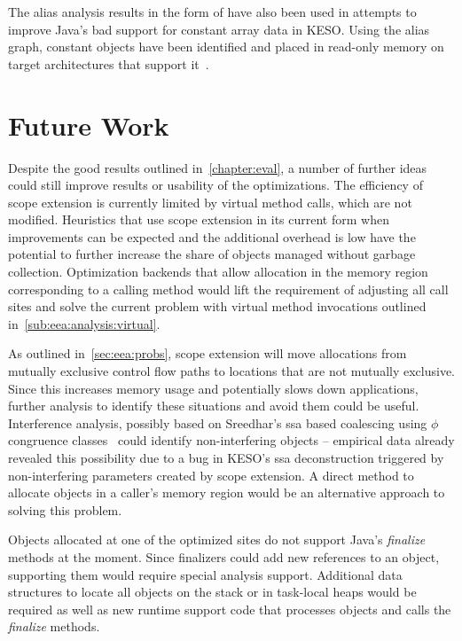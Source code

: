 	The alias analysis results in the form of  have also been used in attempts to improve Java's bad support
	for constant array data in KESO\@. Using the alias graph, constant objects have been identified and placed in read-only
	memory on target architectures that support it~\cite{kuhnle:14}.

	\section*{Future Work}
		\label{sec:conclusion:future-work}
		Despite the good results outlined in~\cref{chapter:eval}, a number of further ideas could still improve results or
		usability of the optimizations. The efficiency of scope extension is currently limited by virtual method calls,
		which are not modified. Heuristics that use scope extension in its current form when improvements can be expected
		and the additional overhead is low have the potential to further increase the share of objects managed without
		garbage collection. Optimization backends that allow allocation in the memory region corresponding to a calling
		method would lift the requirement of adjusting all call sites and solve the current problem with virtual method
		invocations outlined in~\cref{sub:eea:analysis:virtual}.

		As outlined in~\cref{sec:eea:probs}, scope extension will move allocations from mutually exclusive control flow
		paths to locations that are not mutually exclusive. Since this increases memory usage and potentially slows down
		applications, further analysis to identify these situations and avoid them could be useful. Interference analysis,
		possibly based on Sreedhar's \gls{ssa} based coalescing using $\phi$ congruence classes~\cite{sreedhar:99:sas} could
		identify non-interfering objects – empirical data already revealed this possibility due to a bug in KESO's \gls{ssa}
		deconstruction triggered by non-interfering parameters created by scope extension. A direct method to allocate
		objects in a caller's memory region would be an alternative approach to solving this problem.

		Objects allocated at one of the optimized sites do not support Java's \emph{finalize} methods at the moment. Since
		finalizers could add new references to an object, supporting them would require special analysis support. Additional
		data structures to locate all objects on the stack or in task-local heaps would be required as well as new runtime
		support code that processes objects and calls the \emph{finalize} methods.

